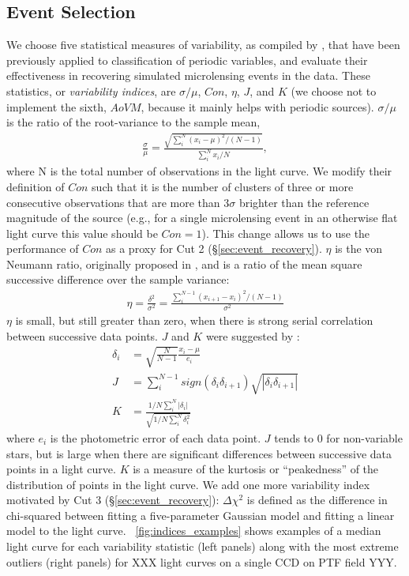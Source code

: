 \documentclass[12pt,preprint]{aastex}
\begin{document}
\subsection{Event Selection} \label{sec:event_selection}
We choose five statistical measures of variability, as compiled by \cite{shin2009}, that have been previously applied to classification of periodic variables, and evaluate their effectiveness in recovering simulated microlensing events in the data. These statistics, or \emph{variability indices}, are $\sigma/\mu$, $Con$, $\eta$, $J$, and $K$ (we choose not to implement the sixth, $AoVM$, because it mainly helps with periodic sources). $\sigma/\mu$ is the ratio of the root-variance to the sample mean, 
\begin{align}
	\frac{\sigma}{\mu} = \frac{\sqrt{\sum^N_i (x_i - \mu)^2 / (N-1)}}{\sum^N_i x_i/N},
\end{align}
where N is the total number of observations in the light curve. We modify their definition of $Con$ such that it is the number of clusters of three or more consecutive observations that are more than $3\sigma$ brighter than the reference magnitude of the source (e.g., for a single microlensing event in an otherwise flat light curve this value should be $Con=1$). This change allows us to use the performance of $Con$ as a proxy for Cut 2 (\S\ref{sec:event_recovery}). $\eta$ is the von Neumann ratio, originally proposed in \cite{von_neumann1941}, and is a ratio of the mean square successive difference over the sample variance:
\begin{align}
	\eta = \frac{\delta^2}{\sigma^2} = \frac{\sum^{N-1}_i(x_{i+1} - x_i)^2/(N-1)}{\sigma^2}
\end{align}
$\eta$ is small, but still greater than zero, when there is strong serial correlation between successive data points. $J$ and $K$ were suggested by \cite{stetson1996}:
\begin{align}
	\delta_i &= \sqrt{\frac{N}{N-1}}\frac{x_i-\mu}{e_i}\\
	J &= \sum^{N-1}_i sign(\delta_i \delta_{i+1})\sqrt{|\delta_i \delta_{i+1}|}\\
	K &= \frac{1/N\sum^N_i |\delta_i|}{\sqrt{1/N\sum^N_i\delta_i^2}}
\end{align}
where $e_i$ is the photometric error of each data point. $J$ tends to 0 for non-variable stars, but is large when there are significant differences between successive data points in a light curve. $K$ is a measure of the kurtosis or ``peakedness'' of the distribution of points in the light curve. We add one more variability index motivated by Cut 3 (\S\ref{sec:event_recovery}): $\Delta \chi^2$ is defined as the difference in chi-squared between fitting a five-parameter Gaussian model and fitting a linear model to the light curve. \figurename~\ref{fig:indices_examples} shows examples of a median light curve for each variability statistic (left panels) along with the most extreme outliers (right panels) for XXX light curves on a single CCD on PTF field YYY.
\end{document}
